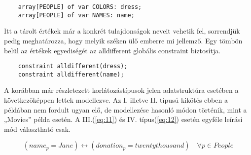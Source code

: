 \documentclass[12pt,a4paper,twoside, openright]{report}
\begin{document}
    
    \begin{lstlisting}
    array[PEOPLE] of var COLORS: dress;
    array[PEOPLE] of var NAMES: name;\end{lstlisting}

    Itt a tárolt értékek már a konkrét tulajdonságok neveit vehetik fel, sorrendjük pedig meghatározza, hogy melyik széken ülő emberre mi jellemző.
    Egy tömbön belül az értékek egyediségét az alldifferent globális constraint biztosítja.
   
    \begin{lstlisting}
    constraint alldifferent(dress);
    constraint alldifferent(name);\end{lstlisting}

    A korábban már részletezett korlátozástípusok jelen adatstruktúra esetében a következőképpen lettek modellezve.
    Az I. illetve II. típusú kikötés ebben a példában nem fordult ugyan elő, de modellezése hasonló módon történik, mint a „Movies” példa esetén.
    A III.(\ref{eq:11}) és IV. típus(\ref{eq:12}) esetén egyféle leírási mód választható csak.

    \begin{equation} \label{eq:11}
    (name_p=Jane) \leftrightarrow (donation_p=twentythousand) \quad \forall p \in People
    \end{equation}
\end{document}
